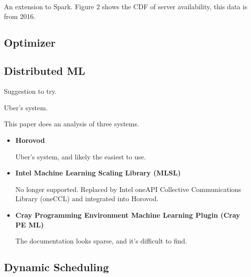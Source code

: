 
An extension to Spark.
Figure 2 shows the CDF of server availability, this data is from 2016.

\subsection{Optimizer}


\noindent \tagoptimizer{}


\subsection{Distributed ML}


Suggestion to try.


Uber's system.



This paper does an analysis of three systems.

\begin{itemize}
  \item \textbf{Horovod}

    Uber's system, and likely the easiest to use.
  \item \textbf{Intel Machine Learning Scaling Library (MLSL)}

    No longer supported. Replaced by Intel oneAPI Collective Communications
    Library (oneCCL) and integrated into Horovod.
  \item \textbf{Cray Programming Environment Machine Learning Plugin (Cray PE
    ML)}

    The documentation looks sparse, and it's difficult to find.
\end{itemize}


\subsection{Dynamic Scheduling}


